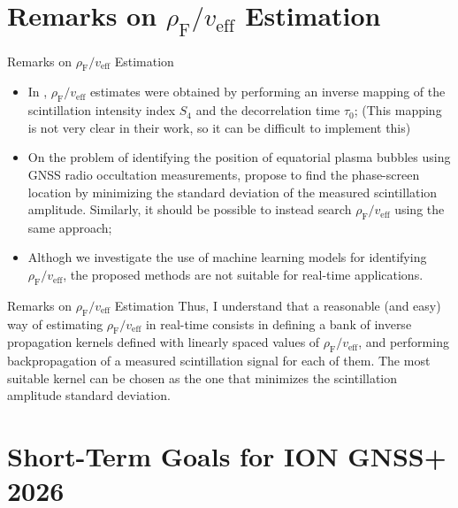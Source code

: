 \documentclass[10pt]{beamer}
\begin{document}
\section{Remarks on $\rho_{\mathrm{F}} / v_{\mathrm{eff}}$ Estimation}
\begin{frame}{Remarks on $\rho_{\mathrm{F}} / v_{\mathrm{eff}}$ Estimation}
    \begin{itemize}
        \item In \parencite{breitschMitigationGlobalNavigation2023}, $\rho_{\mathrm{F}} / v_{\mathrm{eff}}$ estimates were obtained by performing an inverse mapping of the scintillation intensity index $S_4$ and the decorrelation time $\tau_0$; (This mapping is not very clear in their work, so it can be difficult to implement this)
        \item On the problem of identifying the position of equatorial plasma bubbles using GNSS radio occultation measurements, \parencite{alfonsoBackPropagationMethod2024} propose to find the phase-screen location by minimizing the standard deviation of the measured scintillation amplitude. Similarly, it should be possible to instead search $\rho_{\mathrm{F}} / v_{\mathrm{eff}}$ using the same approach;
        \item Althogh we investigate the use of machine learning models for identifying $\rho_{\mathrm{F}} / v_{\mathrm{eff}}$, the proposed methods are not suitable for real-time applications.
    \end{itemize}
\end{frame}

\begin{frame}{Remarks on $\rho_{\mathrm{F}} / v_{\mathrm{eff}}$ Estimation}
    Thus, I understand that a reasonable (and easy) way of estimating $\rho_{\mathrm{F}} / v_{\mathrm{eff}}$ in real-time consists in defining a bank of inverse propagation kernels defined with linearly spaced values of $\rho_{\mathrm{F}} / v_{\mathrm{eff}}$, and performing backpropagation of a measured scintillation signal for each of them. The most suitable kernel can be chosen as the one that minimizes the scintillation amplitude standard deviation.
\end{frame}

\section{Short-Term Goals for ION GNSS+ 2026}
\end{document}
